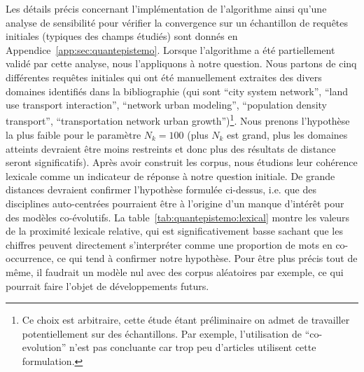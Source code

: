 {Les détails précis concernant l'implémentation de l'algorithme ainsi qu'une analyse de sensibilité pour vérifier la convergence sur un échantillon de requêtes initiales (typiques des champs étudiés) sont donnés en Appendice~\ref{app:sec:quantepistemo}. Lorsque l'algorithme a été partiellement validé par cette analyse, nous l'appliquons à notre question. Nous partons de cinq différentes requêtes initiales qui ont été manuellement extraites des divers domaines identifiés dans la bibliographie (qui sont ``city system network'', ``land use transport interaction'', ``network urban modeling'', ``population density transport'', ``transportation network urban growth'')\footnote{Ce choix est arbitraire, cette étude étant préliminaire on admet de travailler potentiellement sur des échantillons. Par exemple, l'utilisation de ``co-evolution'' n'est pas concluante car trop peu d'articles utilisent cette formulation.}. Nous prenons l'hypothèse la plus faible pour le paramètre $N_k=100$ (plus $N_k$ est grand, plus les domaines atteints devraient être moins restreints et donc plus des résultats de distance seront significatifs)\label{tab:quantepistemo:lexical}. Après avoir construit les corpus, nous étudions leur cohérence lexicale comme un indicateur de réponse à notre question initiale. De grande distances devraient confirmer l'hypothèse formulée ci-dessus, i.e. que des disciplines auto-centrées pourraient être à l'origine d'un manque d'intérêt pour des modèles co-évolutifs. La table~\ref{tab:quantepistemo:lexical} montre les valeurs de la proximité lexicale relative, qui est significativement basse sachant que les chiffres peuvent directement s'interpréter comme une proportion de mots en co-occurrence, ce qui tend à confirmer notre hypothèse. Pour être plus précis tout de même, il faudrait un modèle nul avec des corpus aléatoires par exemple, ce qui pourrait faire l'objet de développements futurs. 
}




